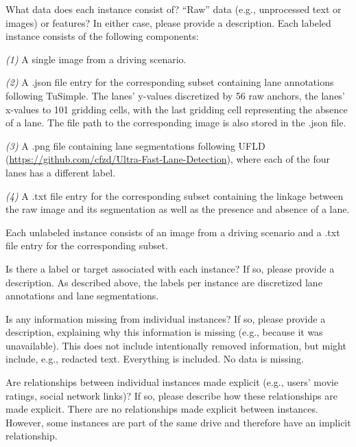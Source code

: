 \documentclass{article}
\begin{document}
	\begin{datasheetitem}{What data does each instance consist of? \normalfont “Raw” data (e.g., unprocessed text or images) or features? In either case, please provide a description.}
		Each labeled instance consists of the following components: \vspace{-2pt}
		
		\textit{(1)} A single  image from a driving scenario. \vspace{-2pt}
		
		\textit{(2)} A .json file entry for the corresponding subset containing lane annotations following TuSimple. The lanes’ y-values discretized by 56 raw anchors, the lanes’ x-values to 101 gridding cells, with the last gridding cell representing the absence of a lane. The file path to the corresponding image is also stored in the .json file. \vspace{-2pt}
		
		\textit{(3)} A .png file containing lane segmentations following UFLD (\url{https://github.com/cfzd/Ultra-Fast-Lane-Detection}), where each of the four lanes has a different label. \vspace{-2pt}
		
		\textit{(4)} A .txt file entry for the corresponding subset containing the linkage between the raw image and its segmentation as well as the presence and absence of a lane. \vspace{-2pt}
		
		Each unlabeled instance consists of an  image from a driving scenario and a .txt file entry for the corresponding subset.
	\end{datasheetitem}
	\begin{datasheetitem}{Is there a label or target associated with each instance? \normalfont If so, please provide a description.}
		As described above, the labels per instance are discretized lane annotations and lane segmentations.
	\end{datasheetitem}
	\begin{datasheetitem}{Is any information missing from individual instances? \normalfont If so, please provide a description, explaining why this information is missing (e.g., because it was unavailable). This does not include intentionally removed information, but might include, e.g., redacted text.}
		Everything is included. No data is missing.
	\end{datasheetitem}
	\begin{datasheetitem}{Are relationships between individual instances made explicit (e.g., users’ movie ratings, social network links)? \normalfont If so, please describe how these relationships are made explicit.}
		There are no relationships made explicit between instances. However, some instances are part of the same drive and therefore have an implicit relationship.
	\end{datasheetitem}
\end{document}
